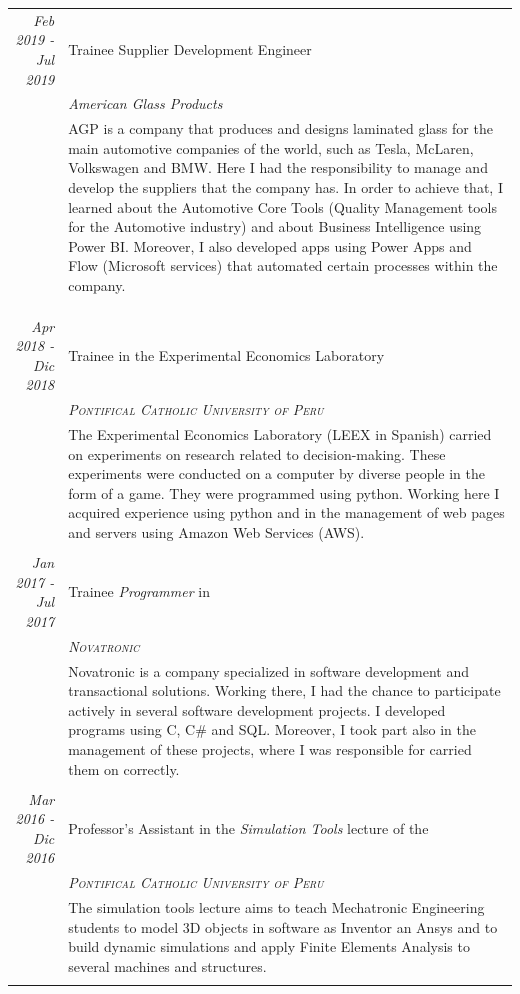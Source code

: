 \documentclass[a4paper,10pt]{article}
\begin{document}
\begin{longtable}{r|p{11cm}}
  \emph{Feb 2019 - Jul 2019} & Trainee Supplier Development Engineer \\&\emph{American Glass Products}\\&\footnotesize{AGP is a company that produces and designs laminated glass for the main automotive companies of the world, such as Tesla, McLaren, Volkswagen and BMW. Here I had the responsibility to manage and develop the suppliers that the company has. In order to achieve that,  I learned about the Automotive Core Tools (Quality Management tools for the Automotive industry) and about Business Intelligence using Power BI. Moreover, I also developed apps using Power Apps and Flow (Microsoft services)  that automated certain processes within the company.}\\&\\
  \\&\\
  \emph{Apr 2018 - Dic 2018} & Trainee in the Experimental Economics Laboratory \\&\emph{\textsc{Pontifical Catholic University of Peru}}\\&\footnotesize{The Experimental Economics Laboratory (LEEX in Spanish) carried on experiments on research related to decision-making. These experiments were conducted on a computer by diverse people in the form of a game. They were programmed using python. Working here I acquired experience using python and in the management of web pages and servers using Amazon Web Services (AWS).}\\&\\
  \emph{Jan 2017 - Jul 2017} & Trainee \emph{Programmer} in \\&\emph{\textsc{Novatronic}}\\&\footnotesize{Novatronic is a company specialized in software development and transactional solutions. Working there, I had the chance to participate actively in several software development projects. I developed programs using C, C\# and SQL. Moreover, I took part also in the management of these projects, where I was responsible for carried them on correctly.}\\&\\
 \emph{Mar 2016 - Dic 2016} & Professor's Assistant in the \emph{Simulation Tools} lecture of the \\&\emph{\textsc{Pontifical Catholic University of Peru}}\\&\footnotesize{The simulation tools lecture aims  to teach Mechatronic Engineering students to model 3D objects in software as Inventor an Ansys and to build dynamic simulations and apply Finite Elements Analysis to several machines and structures.
 }\\&\\
\end{longtable}
\end{document}
